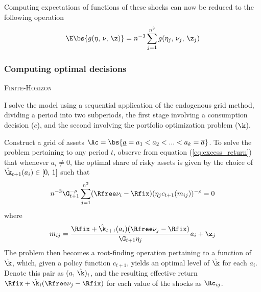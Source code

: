 Computing expectations of functions of these shocks can now be reduced to the following operation
\[
\E\bs{g(\eta,\,\nu,\,\z)} = n^{-3}\sum_{j=1}^{n^3}g(\eta_j,\,\nu_j,\,\z_j)
\]

\subsubsection{Computing optimal decisions}

\textsc{Finite-Horizon}

I solve the model using a sequential application of the endogenous grid method, dividing a period into two subperiods, the first stage involving a consumption decision ($c$), and the second involving the portfolio optimization problem ($\k$).

Construct a grid of assets $\Ac = \bs{\underline{a} = a_1 < a_2 < ... < a_k = \overline{a}}$. To solve the problem pertaining to any period $t$, observe from equation (\ref{eq:excess_return}) that whenever $a_i \neq 0$, the optimal share of risky assets is given by the choice of $\hat{\k}_{t+1}(a_i) \in [0,\,1]$ such that
\begin{equation}\label{eq:kappa}
n^{-3}\G_{t+1}^{-\rho}\sum_{j=1}^{n^3}(\Rfree\nu_i - \Rfix)(\eta_{j}c_{t+1}(m_{ij}))^{-\rho} = 0
\end{equation}
where
\[
m_{ij} = \frac{\Rfix + \hat{\k}_{t+1}(a_i)(\Rfree\nu_j - \Rfix)}{\G_{t+1}\eta_{j}}a_i + \z_j
\]
The problem then becomes a root-finding operation pertaining to a function of $\hat{\k}$, which, given a policy function $c_{t+1}$, yields an optimal level of $\hat{\k}$ for each $a_i$. Denote this pair as $(a,\,\hat{\k})_{i}$, and the resulting effective return $\Rfix + \hat{\k}_{i}(\Rfree\nu_{j} - \Rfix)$ for each value of the shocks as $\Rc_{ij}$.


